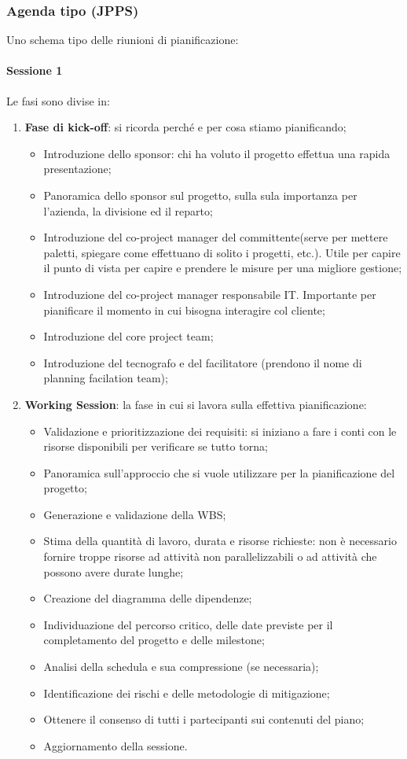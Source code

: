 \subsubsection{Agenda tipo (JPPS)}
Uno schema tipo delle riunioni di pianificazione:
\paragraph{Sessione 1}
Le fasi sono divise in:
\begin{enumerate}
	\item \textbf{Fase di kick-off}: si ricorda perché e per cosa stiamo pianificando;
	\begin{itemize}
		\item Introduzione dello sponsor: chi ha voluto il progetto effettua una rapida presentazione;
		\item Panoramica dello sponsor sul progetto, sulla sula importanza per l'azienda, la divisione ed il reparto;
		\item Introduzione del co-project manager del committente(serve per mettere paletti, spiegare come effettuano di solito i progetti, etc.). Utile per capire il punto di vista per capire e prendere le misure per una migliore gestione;
		\item Introduzione del co-project manager responsabile IT. Importante per pianificare il momento in cui bisogna interagire col cliente;
		\item Introduzione del core project team;
		\item Introduzione del tecnografo e del facilitatore (prendono il nome di planning facilation team);
	\end{itemize}
	\item \textbf{Working Session}: la fase in cui si lavora sulla effettiva pianificazione:
	\begin{itemize}
		\item Validazione e prioritizzazione dei requisiti: si iniziano a fare i conti con le risorse disponibili per verificare se tutto torna;
		\item Panoramica sull'approccio che si vuole utilizzare per la pianificazione del progetto;
		\item Generazione e validazione della WBS;
		\item Stima della quantità di lavoro, durata e risorse richieste: non è necessario fornire troppe risorse ad attività non parallelizzabili o ad attività che possono avere durate lunghe;
		\item Creazione del diagramma delle dipendenze;
		\item Individuazione del percorso critico, delle date previste per il completamento del progetto e delle milestone;
		\item Analisi della schedula e sua compressione (se necessaria);
		\item Identificazione dei rischi e delle metodologie di mitigazione;
		\item Ottenere il consenso di tutti i partecipanti sui contenuti del piano;
		\item Aggiornamento della sessione.
	\end{itemize}
\end{enumerate}
